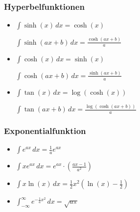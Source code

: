\subsubsection{Hyperbelfunktionen}
\begin{itemize}[leftmargin=*]
	\item 
	\begin{minipage}{0.43\columnwidth}
		$\int \sinh(x) \,dx = \cosh(x)$
	\end{minipage}
	\begin{minipage}{0.52\columnwidth}
		$\int \sinh(ax + b) \,dx = \frac{\cosh(ax + b)}{a}$
	\end{minipage}

	\item
	\begin{minipage}{0.43\columnwidth}
		$\int \cosh(x) \,dx = \sinh(x)$
	\end{minipage}
	\begin{minipage}{0.52\columnwidth}
		$\int \cosh(ax + b) \,dx = \frac{\sinh(ax + b)}{a}$
	\end{minipage}
	
	\item
	\begin{minipage}{0.43\columnwidth}
		$\int \tan(x) \,dx = \log(\cosh(x))$
	\end{minipage}
	\begin{minipage}{0.52\columnwidth}
		$\int \tan(ax + b) \,dx = \frac{\log(\cosh(ax+b))}{a}$
	\end{minipage}
\end{itemize}

\subsubsection{Exponentialfunktion}
\begin{itemize}[leftmargin=*]
  	\item $\int e^{ax} \,dx = \frac{1}{a} e^{ax}$ 
	\item $\int x e^{ax} \,dx = e^{ax} \cdot \left ( \frac{ax - 1}{a^2} \right )$
	\item $\int x \ln(x) \,dx = \frac{1}{2} x^2 (\ln(x) - \frac{1}{2})$
	\item $\int_{-\infty}^\infty e^{-\frac{1}{a}x^2} \,dx = \sqrt{a \pi}$
\end{itemize}
\pagebreak
